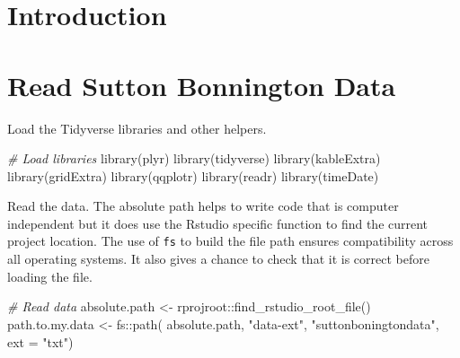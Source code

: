\documentclass{article}
\title{\myTitleMainTitle}
\author{
    Dr Paul J. Palmer
   \\
    Wolfson School of Mechanical, Electrical and Manufacturing Engineering \\
    Loughborough University \\
  Leicestershire VC55 \\
  \texttt{\href{mailto:p.j.palmer@lboro.ac.uk}{\nolinkurl{p.j.palmer@lboro.ac.uk}}} \\
  }
\newenvironment{Shaded}{\begin{snugshade}}{\end{snugshade}}
\newcommand{\AttributeTok}[1]{\textcolor[rgb]{0.77,0.63,0.00}{#1}}
\newcommand{\CommentTok}[1]{\textcolor[rgb]{0.56,0.35,0.01}{\textit{#1}}}
\newcommand{\FunctionTok}[1]{\textcolor[rgb]{0.00,0.00,0.00}{#1}}
\newcommand{\NormalTok}[1]{#1}
\newcommand{\OtherTok}[1]{\textcolor[rgb]{0.56,0.35,0.01}{#1}}
\newcommand{\SpecialCharTok}[1]{\textcolor[rgb]{0.00,0.00,0.00}{#1}}
\newcommand{\StringTok}[1]{\textcolor[rgb]{0.31,0.60,0.02}{#1}}
\begin{document}
\maketitle

\def\tightlist{}


\begin{abstract}
\myAbstract
\end{abstract}


\hypertarget{introduction}{%
\section{Introduction}\label{introduction}}

\myTitleMainTitle

\hypertarget{read-sutton-bonnington-data}{%
\section{Read Sutton Bonnington Data}\label{read-sutton-bonnington-data}}

Load the Tidyverse libraries and other helpers.

\begin{Shaded}
\begin{Highlighting}[]
\CommentTok{\# Load libraries}
\FunctionTok{library}\NormalTok{(plyr)}
\FunctionTok{library}\NormalTok{(tidyverse)}
\FunctionTok{library}\NormalTok{(kableExtra)}
\FunctionTok{library}\NormalTok{(gridExtra)}
\FunctionTok{library}\NormalTok{(qqplotr)}
\FunctionTok{library}\NormalTok{(readr)}
\FunctionTok{library}\NormalTok{(timeDate)}
\end{Highlighting}
\end{Shaded}

Read the data. The absolute path helps to write code that is computer independent but it does use the Rstudio specific function to find the current project location. The use of \texttt{fs} to build the file path ensures compatibility across all operating systems. It also gives a chance to check that it is correct before loading the file.

\begin{Shaded}
\begin{Highlighting}[]
\CommentTok{\# Read data}
\NormalTok{absolute.path }\OtherTok{\textless{}{-}}\NormalTok{ rprojroot}\SpecialCharTok{::}\FunctionTok{find\_rstudio\_root\_file}\NormalTok{()}
\NormalTok{path.to.my.data }\OtherTok{\textless{}{-}}\NormalTok{ fs}\SpecialCharTok{::}\FunctionTok{path}\NormalTok{( absolute.path,}
                             \StringTok{"data{-}ext"}\NormalTok{,}
                             \StringTok{"suttonboningtondata"}\NormalTok{, }
                            \AttributeTok{ext =} \StringTok{"txt"}\NormalTok{)}
\end{Highlighting}
\end{Shaded}
\end{document}
